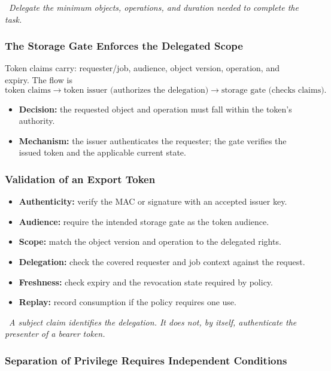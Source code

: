 \documentclass[hidelinks]{article}
\newcommand{\callout}[1]{\par\smallskip\noindent{\color{capri}$\blacktriangleright$}\ \textit{#1}\par\smallskip}
\begin{document}
\callout{Delegate the minimum objects, operations, and duration needed to complete the task.}

\subsubsection{The Storage Gate Enforces the Delegated Scope}

Token claims carry: requester/job, audience, object version, operation, and expiry. The flow is
\[
\text{token claims} \to \text{token issuer (authorizes the delegation)} \to \text{storage gate (checks claims)}.
\]
\begin{itemize}
    \item \textbf{Decision:} the requested object and operation must fall within the token's authority.
    \item \textbf{Mechanism:} the issuer authenticates the requester; the gate verifies the issued token and the applicable current state.
\end{itemize}

\subsubsection{Validation of an Export Token}

\begin{itemize}
    \item \textbf{Authenticity:} verify the MAC or signature with an accepted issuer key.
    \item \textbf{Audience:} require the intended storage gate as the token audience.
    \item \textbf{Scope:} match the object version and operation to the delegated rights.
    \item \textbf{Delegation:} check the covered requester and job context against the request.
    \item \textbf{Freshness:} check expiry and the revocation state required by policy.
    \item \textbf{Replay:} record consumption if the policy requires one use.
\end{itemize}

\callout{A subject claim identifies the delegation. It does not, by itself, authenticate the presenter of a bearer token.}

\subsubsection{Separation of Privilege Requires Independent Conditions}
\end{document}

